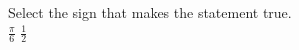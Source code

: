 \documentclass{ximera}
\author{David Kish}
\begin{document}
\begin{exercise}
Select the sign that makes the statement true.\\
$\frac{\pi}{6}$ \wordChoice{\choice{$<$}\choice[correct]{$>$}\choice{$=$}} $\frac{1}{2}$ 

\end{exercise}
\end{document}
